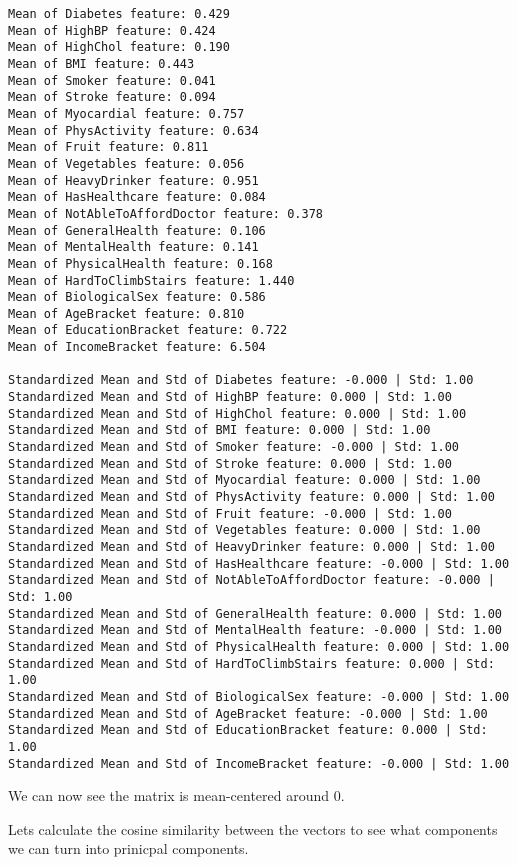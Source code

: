 \documentclass[11pt]{article}
\begin{document}
    \begin{Verbatim}[commandchars=\\\{\}]
Mean of Diabetes feature: 0.429
Mean of HighBP feature: 0.424
Mean of HighChol feature: 0.190
Mean of BMI feature: 0.443
Mean of Smoker feature: 0.041
Mean of Stroke feature: 0.094
Mean of Myocardial feature: 0.757
Mean of PhysActivity feature: 0.634
Mean of Fruit feature: 0.811
Mean of Vegetables feature: 0.056
Mean of HeavyDrinker feature: 0.951
Mean of HasHealthcare feature: 0.084
Mean of NotAbleToAffordDoctor feature: 0.378
Mean of GeneralHealth feature: 0.106
Mean of MentalHealth feature: 0.141
Mean of PhysicalHealth feature: 0.168
Mean of HardToClimbStairs feature: 1.440
Mean of BiologicalSex feature: 0.586
Mean of AgeBracket feature: 0.810
Mean of EducationBracket feature: 0.722
Mean of IncomeBracket feature: 6.504

Standardized Mean and Std of Diabetes feature: -0.000 | Std: 1.00
Standardized Mean and Std of HighBP feature: 0.000 | Std: 1.00
Standardized Mean and Std of HighChol feature: 0.000 | Std: 1.00
Standardized Mean and Std of BMI feature: 0.000 | Std: 1.00
Standardized Mean and Std of Smoker feature: -0.000 | Std: 1.00
Standardized Mean and Std of Stroke feature: 0.000 | Std: 1.00
Standardized Mean and Std of Myocardial feature: 0.000 | Std: 1.00
Standardized Mean and Std of PhysActivity feature: 0.000 | Std: 1.00
Standardized Mean and Std of Fruit feature: -0.000 | Std: 1.00
Standardized Mean and Std of Vegetables feature: 0.000 | Std: 1.00
Standardized Mean and Std of HeavyDrinker feature: 0.000 | Std: 1.00
Standardized Mean and Std of HasHealthcare feature: -0.000 | Std: 1.00
Standardized Mean and Std of NotAbleToAffordDoctor feature: -0.000 | Std: 1.00
Standardized Mean and Std of GeneralHealth feature: 0.000 | Std: 1.00
Standardized Mean and Std of MentalHealth feature: -0.000 | Std: 1.00
Standardized Mean and Std of PhysicalHealth feature: 0.000 | Std: 1.00
Standardized Mean and Std of HardToClimbStairs feature: 0.000 | Std: 1.00
Standardized Mean and Std of BiologicalSex feature: -0.000 | Std: 1.00
Standardized Mean and Std of AgeBracket feature: -0.000 | Std: 1.00
Standardized Mean and Std of EducationBracket feature: 0.000 | Std: 1.00
Standardized Mean and Std of IncomeBracket feature: -0.000 | Std: 1.00
    \end{Verbatim}

    We can now see the matrix is mean-centered around 0.

Let\textquotesingle s calculate the cosine similarity between the
vectors to see what components we can turn into prinicpal components.
\end{document}

